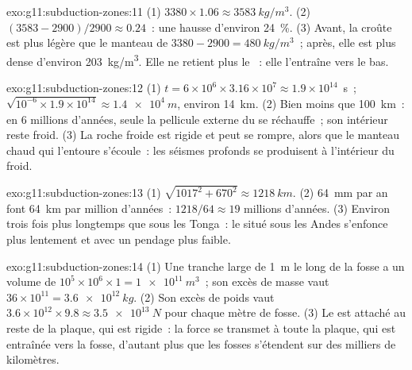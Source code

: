 \begin{solution}{exo:g11:subduction-zones:11}
(1) $3380 \times 1.06 \approx \qty{3583}{kg/m^3}$. (2)
$(3583 - 2900)/2900 \approx 0.24$~: une hausse d'environ \qty{24}{\percent}.
(3) Avant, la croûte est plus légère que le manteau de
$3380 - 2900 = \qty{480}{kg/m^3}$~; après, elle est plus dense d'environ
\qty{203}{kg/m^3}. Elle ne retient plus le ~: elle
l'entraîne vers le bas.
\end{solution}

\begin{solution}{exo:g11:subduction-zones:12}
(1) $t = 6 \times 10^6 \times 3.16 \times 10^7 \approx 1.9 \times 10^{14}$~s~;
$\sqrt{10^{-6} \times 1.9 \times 10^{14}} \approx \qty{1.4e4}{m}$, environ
\qty{14}{km}. (2) Bien moins que \qty{100}{km}~: en 6 millions d'années,
seule la pellicule externe du  se réchauffe~; son intérieur
reste froid. (3) La roche froide est rigide et peut se rompre, alors que le
manteau chaud qui l'entoure s'écoule~: les séismes profonds se produisent à
l'intérieur du  froid.
\end{solution}

\begin{solution}{exo:g11:subduction-zones:13}
(1) $\sqrt{1017^2 + 670^2} \approx \qty{1218}{km}$. (2) \qty{64}{mm} par an
font \qty{64}{km} par million d'années~: $1218/64 \approx 19$ millions
d'années. (3) Environ trois fois plus longtemps que sous les Tonga~: le
 situé sous les Andes s'enfonce plus lentement et avec un
pendage plus faible.
\end{solution}

\begin{solution}{exo:g11:subduction-zones:14}
(1) Une tranche large de \qty{1}{m} le long de la fosse a un volume de
$10^5 \times 10^6 \times 1 = \qty{1e11}{m^3}$~; son excès de masse vaut
$36 \times 10^{11} = \qty{3.6e12}{kg}$. (2) Son excès de poids vaut
$3.6 \times 10^{12} \times 9.8 \approx \qty{3.5e13}{N}$ pour chaque mètre de
fosse. (3) Le  est attaché au reste de la plaque, qui est
rigide~: la force se transmet à toute la plaque, qui est entraînée vers la
fosse, d'autant plus que les fosses s'étendent sur des milliers de
kilomètres.
\end{solution}

